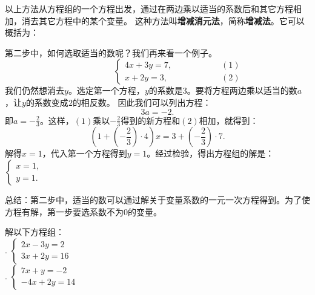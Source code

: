 \documentclass[12pt,UTF8,fontset=none]{ctexbook}
\begin{document}
以上方法从方程组的一个方程出发，通过在两边乘以适当的系数后和其它方程相加，消去其它方程中的某个变量。
这种方法叫\textbf{增减消元法}，简称\textbf{增减法}。它可以概括为：
\begin{center}
\end{center}

第二步中，如何选取适当的数呢？我们再来看一个例子。
$$ \quad \quad \quad \quad \quad\left\{
\begin{array}{cr}
     4x + 3y = 7, & \quad \quad \quad \quad \quad (1) \\
     x + 2y = 3, & \quad \quad \quad \quad \quad (2)
\end{array}\right.
$$
我们仍然想消去$y$。选定第一个方程，$y$的系数是$3$。要将方程两边乘以适当的数$a$，让$y$的系数变成$2$的相反数。
因此我们可以列出方程：
$$ 3a = -2.$$
即$a = -\frac{2}{3}$。这样，$(1)$乘以$-\frac23$得到的新方程和$(2)$相加，就得到：
$$ \left(1 + (-\frac{2}{3}) \cdot 4\right) x = 3 + (-\frac{2}{3}) \cdot 7.$$
解得$x = 1$，代入第一个方程得到$y = 1$。经过检验，得出方程组的解是：$\left\{ \begin{array}{c}
    x = 1, \\
    y = 1.
\end{array}\right.$

总结：第二步中，适当的数可以通过解关于变量系数的一元一次方程得到。为了使方程有解，第一步要选系数不为$0$的变量。

\begin{xt}\label{xt:6-1-0}
    解以下方程组：\\
    . $ \left\{
        \begin{array}{cr}
             2x - 3y = 2\\
             3x + 2y = 16
        \end{array}\right.
        $ \\
    . $\left\{
        \begin{array}{cr}
                7x + y = -2\\
                -4x + 2y = 14
        \end{array}\right.
        $ 
\end{xt}
\end{document}
